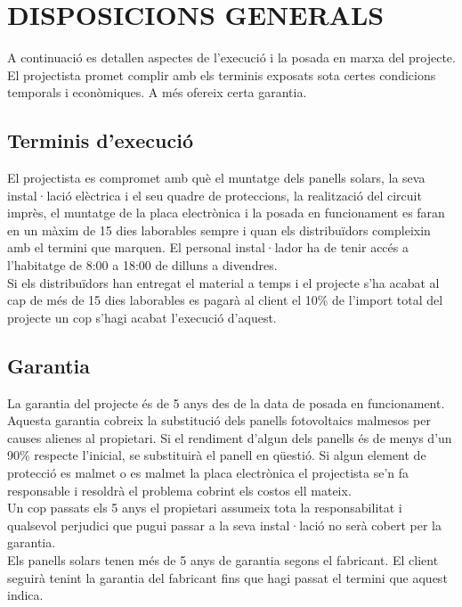 \chapter{\uppercase{Disposicions generals}}
A continuació es detallen aspectes de l'execució i la posada en marxa del projecte. El projectista promet complir amb els terminis exposats sota certes condicions temporals i econòmiques. A més ofereix certa garantia.

\section{Terminis d'execució}
El projectista es compromet amb què el muntatge dels panells solars, la seva instal·lació elèctrica i el seu quadre de proteccions, la realització del circuit imprès, el muntatge de la placa electrònica i la posada en funcionament es faran en un màxim de 15 dies laborables sempre i quan els distribuïdors compleixin amb el termini que marquen. El personal instal·lador ha de tenir accés a l'habitatge de 8:00 a 18:00 de dilluns a divendres.\\
\newline Si els distribuïdors han entregat el material a temps i el projecte s'ha acabat al cap de més de 15 dies laborables es pagarà al client el 10\% de l'import total del projecte un cop s'hagi acabat l'execució d'aquest.

\section{Garantia}
La garantia del projecte és de 5 anys des de la data de posada en funcionament. Aquesta garantia cobreix la substitució dels panells fotovoltaics malmesos per causes alienes al propietari. Si el rendiment d'algun dels panells és de menys d'un 90\% respecte l'inicial, se substituirà el panell en qüestió. Si algun element de protecció es malmet o es malmet la placa electrònica el projectista se'n fa responsable i resoldrà el problema cobrint els costos ell mateix.\\
\newline Un cop passats els 5 anys el propietari assumeix tota la responsabilitat i qualsevol perjudici que pugui passar a la seva instal·lació no serà cobert per la garantia.\\
\newline Els panells solars tenen més de 5 anys de garantia segons el fabricant. El client seguirà tenint la garantia del fabricant fins que hagi passat el termini que aquest indica.


